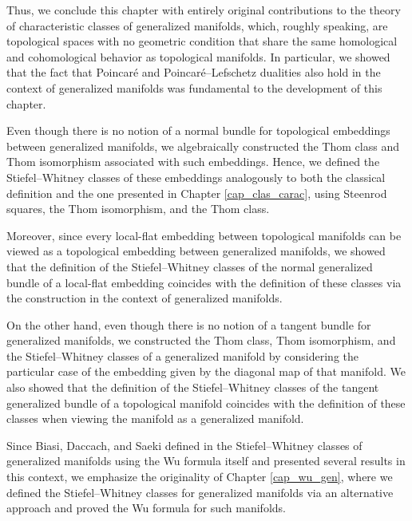 \documentclass[12pt,oneside]{book}
\begin{document}
    Thus, we conclude this chapter with entirely original contributions to the theory of characteristic classes of generalized 
    manifolds, which, roughly speaking, are topological spaces with no geometric condition that share the same 
    homological and cohomological behavior as topological manifolds. In particular, we showed that the fact that 
    Poincaré and Poincaré–Lefschetz dualities also hold in the context of 
    generalized manifolds was fundamental to the development of this chapter.

    Even though there is no notion of a normal bundle for topological embeddings between generalized 
    manifolds, we algebraically constructed the Thom class and Thom 
    isomorphism associated with such embeddings. Hence, we defined the Stiefel–Whitney 
    classes of these embeddings analogously to both the classical definition and the one presented in 
    Chapter \ref{cap_clas_carac}, using Steenrod squares, the Thom isomorphism, and the Thom class.

    Moreover, since every local-flat embedding between topological manifolds can be viewed as a topological 
    embedding between generalized manifolds, we showed that the definition of the Stiefel–Whitney classes of the normal generalized 
    bundle of a local-flat embedding coincides with the definition of these classes via the construction in 
    the context of generalized manifolds.

    On the other hand, even though there is no notion of a tangent bundle for generalized manifolds, we constructed the Thom class, 
    Thom isomorphism, and the Stiefel–Whitney classes of a generalized manifold by considering the particular case of the embedding given by 
    the diagonal map of that manifold. We also showed that the definition of the Stiefel–Whitney classes of the tangent 
    generalized bundle of a topological manifold coincides with the definition of these classes when 
    viewing the manifold as a generalized manifold.

    Since Biasi, Daccach, and Saeki defined in \cite{biasi} the Stiefel–Whitney classes of generalized manifolds using the Wu formula itself 
    and presented several results in this context, we emphasize the originality of Chapter \ref{cap_wu_gen}, where we defined the 
    Stiefel–Whitney classes for generalized manifolds via an alternative approach and proved the Wu formula for such manifolds.
\end{document}
